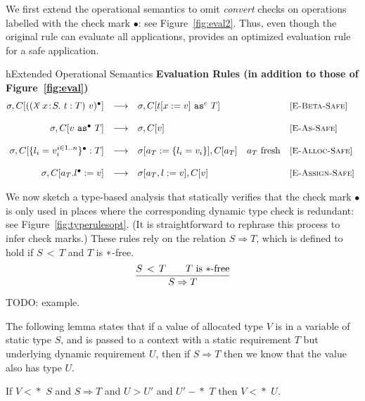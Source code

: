 \documentclass{article}
\newcommand{\safe}{\bullet}
\newcommand{\lam}[5]{\lambda\!^{#1}\,#2\!:\!#3.\,\,#5:#4}
\newcommand{\app}[3]{(#2~#3)^{#1}}
\newcommand{\dynamic}{\t{*}}
\newcommand{\cast}[3]{#2~\t{as}^{#1}~#3}
\newcommand{\subtypeword}{\,<\,}
\newcommand{\subtype}[2]{#1 \subtypeword #2}
\newcommand{\compatible}[2]{#1 \leadsto #2}
\renewcommand{\compatible}[2]{#1 -\!\!\!*\,\, #2}
\newcommand{\comsubtype}[2]{#1 <\!\!\leadsto #2}
\renewcommand{\comsubtype}[2]{#1 <\!\!\!*\,\, #2}
\newcommand{\implies}[2]{#1\Implies #2}
\renewcommand{\t}[1]{{\tt #1}}
\newcommand{\Implies}[0]{\Rightarrow}
\newcommand{\red}[0]{\longrightarrow}  %
\newcommand{\lred}[0]{\red}  %
\newcommand{\objty}[1]{\{#1\}}
\newcommand{\obje}[3]{\{#2\}^{#1}:{#3}}
\newcommand{\objv}[1]{\{#1\}}
\newcommand{\objset}[4]{#2.#3^{#1}:=#4}
\begin{document}
We first extend the operational semantics to omit \emph{convert} checks on operations labelled with the check mark $\safe$: see Figure~\ref{fig:eval2}. Thus, even though the original rule  can evaluate all applications,  provides an optimized evaluation rule for a safe application.

\begin{displayfigure}{h}{Extended Operational Semantics}
\label{fig:eval2} 
\footnotesize
{\bf Evaluation Rules (in addition to those of Figure~\ref{fig:eval})}
\[
\begin{array}{@{}rclll}
	\sigma,C[{\app{\safe}{(\lam{c}{x}{S}{T}{t})}{v}}]
	&\lred&
	\sigma,C[\cast{c}{t[x:=v]}{T}]
	&&\rel{E-Beta-Safe}
\\~\\
	\sigma,C[\cast{\safe}{v}{T}]
	&\lred&
	\sigma,C[v]
	&&\rel{E-As-Safe}
\\~\\
	\sigma,C[\obje{\safe}{l_i=v_i^{i\in 1..n}}{T}]
	&\lred&
	\sigma[a_T:=\objv{l_i=v_i}],C[a_T] 
	&\mbox{$a_T$ fresh}
	&\rel{E-Alloc-Safe} 
\\~\\
	\sigma,C[\objset{\safe}{a_T}{l}{v}]
	&\lred&
	\sigma[a_T,l:=v],C[v] 
	& 
	&\rel{E-Assign-Safe} 
\end{array}
\]
 \end{displayfigure} 


We now sketch a type-based analysis that statically verifies that the check mark $\safe$ is only used in places where the
corresponding dynamic type check is redundant: see Figure~\ref{fig:typerulesopt}. (It is straightforward to rephrase this process to infer check marks.)
These rules rely on the relation $S\Implies T$, which is defined to hold if $\subtype S T$ and $T$ is $\dynamic$-free.
\[
\frac{\subtype S T \qquad \mbox{$T$ is $\dynamic$-free}}
	{\implies S T}
\]

TODO: example.

The following lemma states that if a value of allocated type $V$ is in a variable of static type $S$,
and is passed to a context with a static requirement $T$ but underlying dynamic requirement $U$,
then if $\implies S T$ then we know that the value also has type $U$.
 
\begin{lemma}
If $\comsubtype V {S}$ and $S\Implies T$ and $U > U'$ and $\compatible {U'} T$ then $\comsubtype V U$.
\end{lemma}
\end{document}
